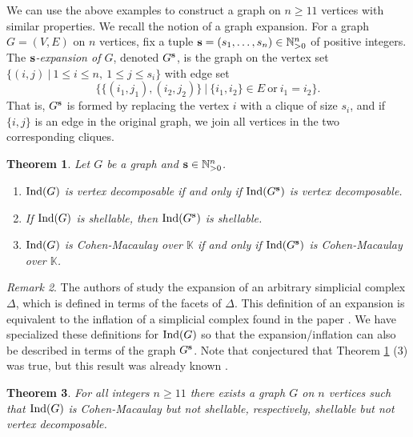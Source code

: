 \documentclass[10pt,a4paper]{amsart}
\theoremstyle{plain}
\newtheorem{theorem}{Theorem}[section]
\theoremstyle{definition}
\theoremstyle{remark}
\newtheorem{remark}[theorem]{Remark}
\numberwithin{equation}{section}
\numberwithin{equation}{section}
\begin{document}
We can use the above examples to construct a graph on
$n \geq 11$ vertices with similar properties.  We
recall the notion of a graph expansion.  For
a graph $G=(V,E)$ on $n$ vertices, fix a tuple ${\bf s}=(s_1,\ldots,s_n) \in
\mathbb{N}^n_{> 0 }$ of positive integers.  The 
{\it ${\bf s}$-expansion of $G$}, denoted $G^{\bf s}$, is the 
graph on the vertex set 
$\{(i,j) ~|~ 1 \leq i \leq n, ~ 1 \leq j \leq s_i\}$
with edge set $$\{\{(i_1,j_1),(i_2,j_2)\} ~|~ \{i_1,i_2\} \in E ~\mbox{or}~ i_1=i_2\}.$$
That is, $G^{{\bf s}}$ is formed by replacing the vertex $i$ with a clique of
size $s_i$, and if $\{i,j\}$ is an edge in the original graph, we join
all vertices in the two corresponding cliques. 

\begin{theorem}\label{thm:expansion}
Let $G$ be a graph and ${\bf s} \in \mathbb{N}^n_{>0}$. 
\begin{enumerate}
    \item \cite[Theorem 2.7]{MKA2016} 
    ${\rm Ind}(G)$ is vertex decomposable if and only if 
    ${\rm Ind}(G^{\bf s})$ is 
    vertex decomposable.
    \item \cite[Theorem 2.12]{MKA2016} If ${\rm Ind}(G)$ is shellable, 
    then ${\rm Ind}(G^{\bf s})$ is shellable.
    \item \cite[Corollary 6.4]{BWW2005} \cite[Theorem 2.4]{RAM2016}
    ${\rm Ind}(G)$ is Cohen-Macaulay over $\mathbb{K}$ if and only if 
    ${\rm Ind}(G^{\bf s})$ is Cohen-Macaulay over $\mathbb{K}$.
\end{enumerate}
\end{theorem}

\begin{remark}
The authors of \cite{MKA2016,RAM2016} study the expansion
of an arbitrary simplicial complex $\Delta$, which is defined in terms
of the facets of $\Delta$.  This definition of an expansion is 
equivalent to the inflation of a simplicial complex found 
in the paper \cite{BWW2005}.  
We have specialized these definitions for ${\rm Ind}(G)$ so that the
expansion/inflation can also be described in terms of the graph $G^{\bf s}$.
Note that \cite{MKA2016} conjectured that Theorem \ref{thm:expansion} (3)
was true, but this result was already known \cite{BWW2005}.
\end{remark}


\begin{theorem}
    For all integers $n \geq 11$
    there exists a graph $G$ on $n$ vertices  such
        that ${\rm Ind}(G)$ is Cohen-Macaulay but not shellable,
        respectively, shellable but not vertex decomposable.
\end{theorem}
\end{document}
